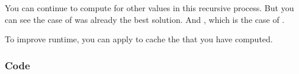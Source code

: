 \documentclass[letterpaper,12pt,english]{book}
\begin{document}
\sphinxAtStartPar
You can continue to compute  for other values  in this recursive process. But you can see the case of  was already the best solution. And , which is the case of .

\sphinxAtStartPar
To improve runtime, you can apply  to cache the  that you have computed.


\subsubsection{Code}
\label{\detokenize{Mathematics/09_MTH_279_Perfect_Squares:code}}
\end{document}
